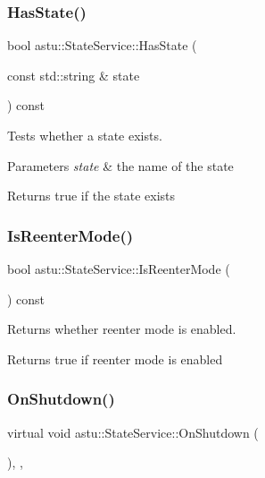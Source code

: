 \subsubsection{\texorpdfstring{Has\+State()}{HasState()}}
{\footnotesize\ttfamily bool astu\+::\+State\+Service\+::\+Has\+State (\begin{DoxyParamCaption}\item[{const std\+::string \&}]{state }\end{DoxyParamCaption}) const}

Tests whether a state exists.


\begin{DoxyParams}{Parameters}
{\em state} & the name of the state \\
\hline
\end{DoxyParams}
\begin{DoxyReturn}{Returns}
{\ttfamily true} if the state exists 
\end{DoxyReturn}
\mbox{\label{classastu_1_1StateService_ac52be3ad8918ef9fe5e64ffbdbdcda94}} 
\subsubsection{\texorpdfstring{Is\+Reenter\+Mode()}{IsReenterMode()}}
{\footnotesize\ttfamily bool astu\+::\+State\+Service\+::\+Is\+Reenter\+Mode (\begin{DoxyParamCaption}{ }\end{DoxyParamCaption}) const\hspace{0.3cm}{\ttfamily [inline]}}

Returns whether reenter mode is enabled.

\begin{DoxyReturn}{Returns}
{\ttfamily true} if reenter mode is enabled 
\end{DoxyReturn}
\mbox{\label{classastu_1_1StateService_ad8fa5b6d52bd795ebba450f119540d87}} 
\subsubsection{\texorpdfstring{On\+Shutdown()}{OnShutdown()}}
{\footnotesize\ttfamily virtual void astu\+::\+State\+Service\+::\+On\+Shutdown (\begin{DoxyParamCaption}{ }\end{DoxyParamCaption})\hspace{0.3cm}{\ttfamily [override]}, {\ttfamily [protected]}, {\ttfamily [virtual]}}

